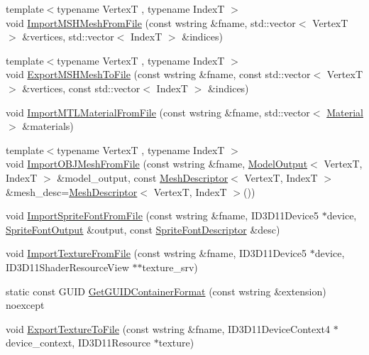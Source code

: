 \begin{DoxyCompactItemize}
\item 
{\footnotesize template$<$typename VertexT , typename IndexT $>$ }\\void \hyperlink{namespacemage_1_1loader_aae8c7494fd3d5d302580c76ba671d280}{Import\+M\+S\+H\+Mesh\+From\+File} (const wstring \&fname, std\+::vector$<$ VertexT $>$ \&vertices, std\+::vector$<$ IndexT $>$ \&indices)
\item 
{\footnotesize template$<$typename VertexT , typename IndexT $>$ }\\void \hyperlink{namespacemage_1_1loader_a86024ac5eb56cab02004527c9bc3a936}{Export\+M\+S\+H\+Mesh\+To\+File} (const wstring \&fname, const std\+::vector$<$ VertexT $>$ \&vertices, const std\+::vector$<$ IndexT $>$ \&indices)
\item 
void \hyperlink{namespacemage_1_1loader_aa93b87b2bbe2d830fabb382da7ecf533}{Import\+M\+T\+L\+Material\+From\+File} (const wstring \&fname, std\+::vector$<$ \hyperlink{classmage_1_1_material}{Material} $>$ \&materials)
\item 
{\footnotesize template$<$typename VertexT , typename IndexT $>$ }\\void \hyperlink{namespacemage_1_1loader_a810ce8ab647023d2133a18ba59df7331}{Import\+O\+B\+J\+Mesh\+From\+File} (const wstring \&fname, \hyperlink{structmage_1_1_model_output}{Model\+Output}$<$ VertexT, IndexT $>$ \&model\+\_\+output, const \hyperlink{structmage_1_1_mesh_descriptor}{Mesh\+Descriptor}$<$ VertexT, IndexT $>$ \&mesh\+\_\+desc=\hyperlink{structmage_1_1_mesh_descriptor}{Mesh\+Descriptor}$<$ VertexT, IndexT $>$())
\item 
void \hyperlink{namespacemage_1_1loader_a9eb452a366c806c9dcc56e14fd6bfbb4}{Import\+Sprite\+Font\+From\+File} (const wstring \&fname, I\+D3\+D11\+Device5 $\ast$device, \hyperlink{structmage_1_1_sprite_font_output}{Sprite\+Font\+Output} \&output, const \hyperlink{structmage_1_1_sprite_font_descriptor}{Sprite\+Font\+Descriptor} \&desc)
\item 
void \hyperlink{namespacemage_1_1loader_a1bf2bc7c0f23f8ad5fb3bba962e456a2}{Import\+Texture\+From\+File} (const wstring \&fname, I\+D3\+D11\+Device5 $\ast$device, I\+D3\+D11\+Shader\+Resource\+View $\ast$$\ast$texture\+\_\+srv)
\item 
static const G\+U\+ID \hyperlink{namespacemage_1_1loader_a2091dc17f88e76e01203509e2607461a}{Get\+G\+U\+I\+D\+Container\+Format} (const wstring \&extension) noexcept
\item 
void \hyperlink{namespacemage_1_1loader_ae6ef9e073e4db5aac8d5cb4a9c354969}{Export\+Texture\+To\+File} (const wstring \&fname, I\+D3\+D11\+Device\+Context4 $\ast$device\+\_\+context, I\+D3\+D11\+Resource $\ast$texture)
$$
\end{DoxyCompactItemize}
